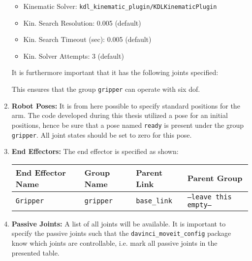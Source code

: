 \begin{enumerate}
\begin{itemize}
\item Kinematic Solver: \texttt{kdl\_kinematic\_plugin/KDLKinematicPlugin}
\item Kin. Search Resolution: 0.005 (default)
\item Kin. Search Timeout (sec): 0.005 (default)
\item Kin. Solver Attempts: 3 (default)
\end{itemize}
It is furthermore important that it has the following joints specified:
\renewcommand*\DTstylecomment{\rmfamily\color{gray}\textsc}
\renewcommand*\DTstyle{\ttfamily\textcolor{black}} 
\begin{figure}[H]
\scriptsize
{}
\end{figure}
This ensures that the group \texttt{gripper} can operate with six \gls{dof}. 
\item \textbf{Robot Poses:} It is from here possible to specify standard positions for the arm. The code developed during this thesis utilized a pose for an initial positions, hence be sure that a pose named \texttt{ready} is present under the group \texttt{gripper}. All joint states should be set to zero for this pose.
\item \textbf{End Effectors:} The end effector is specified as shown:
\begin{table}[H]
\hspace{1cm}\begin{tabular}{l|l|l|l}
\textbf{End Effector Name} & \textbf{Group Name}  & \textbf{Parent Link}  & \textbf{Parent Group}   \\
\hline
 \texttt{Gripper} & \texttt{gripper}  & \texttt{base\_link}  &  \texttt{--leave this empty--} \\
\end{tabular}
\end{table}
\item \textbf{Passive Joints:} A list of all joints will be available. It is important to specify the passive joints such that the \texttt{davinci\_moveit\_config} package know which joints are controllable, i.e. mark all passive joints in the presented table. %

\end{enumerate}
